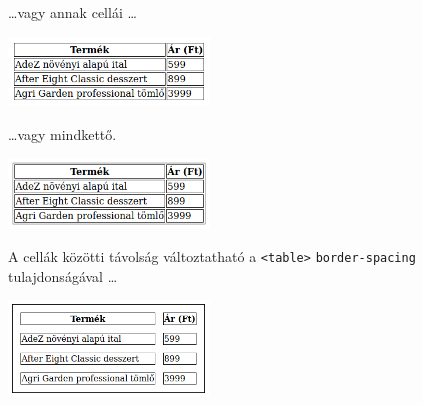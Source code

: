 \begin{frame}
  \dots vagy annak cellái \dots
  \vfill
  \begin{exampleblock}{}
    
  \end{exampleblock}
  \begin{center}
    \includegraphics[width=0.4\textwidth]{tablazat03.png}
  \end{center}
\end{frame}

\begin{frame}
  \dots vagy mindkettő.
  \vfill
  \begin{exampleblock}{}
    
  \end{exampleblock}
  \begin{center}
    \includegraphics[width=0.4\textwidth]{tablazat04.png}
  \end{center}
\end{frame}

\begin{frame}
  A cellák közötti távolság változtatható a \texttt{<table>} \texttt{border-spacing} tulajdonságával \dots
  \vfill
  \begin{exampleblock}{}
    
  \end{exampleblock}
  \begin{center}
    \includegraphics[width=0.4\textwidth]{tablazat05.png}
  \end{center}
\end{frame}


